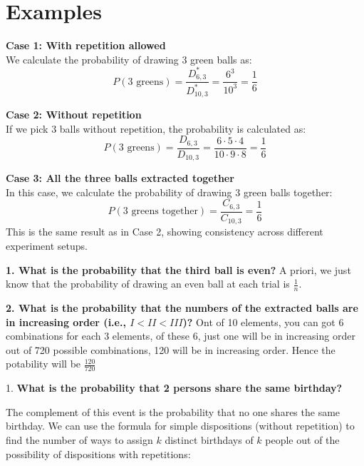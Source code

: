 \section{Examples}



\textbf{Case 1: With repetition allowed} \\
We calculate the probability of drawing 3 green balls as:
\[
P(\text{3 greens}) = \frac{D^*_{6,3}}{D^*_{10,3}} = \frac{6^3}{10^3} = \frac{1}{6}
\]

\textbf{Case 2: Without repetition} \\
If we pick 3 balls without repetition, the probability is calculated as:
\[
P(\text{3 greens}) = \frac{D_{6,3}}{D_{10,3}} = \frac{6\cdot5\cdot4}{10\cdot9\cdot8} = \frac{1}{6}
\]

\textbf{Case 3: All the three balls extracted together} \\
In this case, we calculate the probability of drawing 3 green balls together:
\[
P(\text{3 greens together}) = \frac{C_{6,3}}{C_{10,3}} = \frac{1}{6}
\]
This is the same result as in Case 2, showing consistency across different experiment setups.



\textbf{1. What is the probability that the third ball is even?}
A priori, we just know that the probability of drawing an even ball at each trial is \(\frac{1}{n}\).

\textbf{2. What is the probability that the numbers of the extracted balls are in increasing order (i.e., \(I < II < III\))?}
Ont of 10 elements, you can got 6 combinations for each 3 elements, of these 6, just one will be in increasing order \rightarrow out of 720 possible combinations, 120 will be in increasing order. Hence the potability will be \(\frac{120}{720}\)


1. \textbf{What is the probability that 2 persons share the same birthday?}

The complement of this event is the probability that no one shares the same birthday. We can use the formula for simple dispositions (without repetition) to find the number of ways to assign \(k\) distinct birthdays of \(k\) people out of the possibility of dispositions with repetitions:

